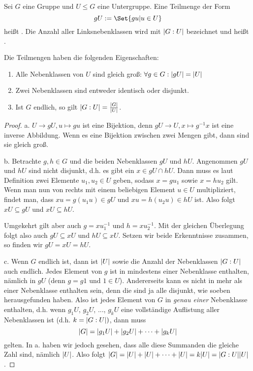 \begin{theoremdef}
Sei $G$ eine Gruppe und $U\leq G$ eine Untergruppe. Eine Teilmenge der Form
\[gU := \Set{gu | u\in U}\]
heißt . Die Anzahl aller Linksnebenklassen wird mit $\lvert G:U\rvert$ bezeichnet und heißt .

Die Teilmengen haben die folgenden Eigenschaften:
\begin{enumerate}
\item Alle Nebenklassen von $U$ sind gleich groß: $\forall g\in G: \lvert gU\rvert = \lvert U\rvert$
\item Zwei Nebenklassen sind entweder identisch oder disjunkt.
\item Ist $G$ endlich, so gilt $\lvert G:U\rvert = \frac{\lvert G\rvert}{\lvert U\rvert}$.
\end{enumerate}
\end{theoremdef}
\begin{proof}
a. $U\to gU, u\mapsto gu$ ist eine Bijektion, denn $gU\to U, x\mapsto g^{-1} x$ ist eine inverse Abbildung. Wenn es eine Bijektion zwischen zwei Mengen gibt, dann sind sie gleich groß.

\medbreak
b. Betrachte $g,h\in G$ und die beiden Nebenklassen $gU$ und $hU$. Angenommen $gU$ und $hU$ sind nicht disjunkt, d.h. es gibt ein $x\in gU\cap hU$. Dann muss es laut Definition zwei Elemente $u_1,u_2\in U$ geben, sodass $x=gu_1$ sowie $x=hu_2$ gilt. Wenn man nun von rechts mit einem beliebigen Element $u\in U$ multipliziert, findet man, dass $xu = g(u_1 u)\in gU$ und $xu=h(u_2 u)\in hU$ ist. Also folgt $xU\subseteq gU$ und $xU\subseteq hU$.

Umgekehrt gilt aber auch $g=xu_1^{-1}$ und $h=xu_2^{-1}$. Mit der gleichen Überlegung folgt also auch $gU\subseteq xU$ und $hU\subseteq xU$. Setzen wir beide Erkenntnisse zusammen, so finden wir $gU=xU=hU$.

\medbreak
c. Wenn $G$ endlich ist, dann ist $\lvert U\rvert$ sowie die Anzahl der Nebenklassen $\lvert G:U\rvert$ auch endlich. Jedes Element von $g$ ist in mindestens einer Nebenklasse enthalten, nämlich in $gU$ (denn $g=g1$ und $1\in U$). Andererseits kann es nicht in mehr als einer Nebenklasse enthalten sein, denn die sind ja alle disjunkt, wie soeben herausgefunden haben. Also ist jedes Element von $G$ in \emph{genau einer} Nebenklasse enthalten, d.h. wenn $g_1 U$, $g_2 U$, ..., $g_k U$ eine vollständige Auflistung aller Nebenklassen ist (d.h. $k=\lvert G:U\rvert)$, dann muss
\[\lvert G\rvert = \lvert g_1 U\rvert + \lvert g_2 U\rvert + \cdots + \lvert g_k U\rvert\]
gelten. In a. haben wir jedoch gesehen, dass alle diese Summanden die gleiche Zahl sind, nämlich $\lvert U\rvert$. Also folgt $\lvert G\rvert=\lvert U\rvert+\lvert U\rvert+\cdots+\lvert U\rvert = k\lvert U\rvert = \lvert G:U\rvert\lvert U\rvert$.
\end{proof}

